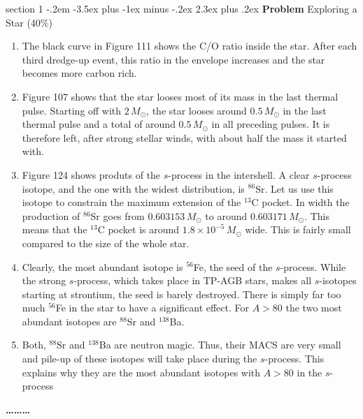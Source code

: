 \documentclass[letterpaper,12pt,twoside=false,DIV=11]{scrartcl}
\makeatletter
\newenvironment{problem}{\@startsection
    {section}
    {1}
    {-.2em}
    {-3.5ex plus -1ex minus -.2ex}
    {2.3ex plus .2ex}
    {
        \pagebreak[3] %
        \noindent\sffamily\bfseries Problem
    }
}
{
    \begin{center}\large\bfseries\ldots\ldots\ldots\end{center}
}
\providecommand{\ex}[1]{\ensuremath{^{#1}}}
\makeatother
\begin{document}
\begin{problem}{Exploring a Star (40\%)}

\begin{enumerate}
    \item The black curve in Figure 111 shows the C/O ratio inside the star. After each third dredge-up event, this ratio in the envelope increases and the star becomes more carbon rich.
    \item Figure 107 shows that the star looses most of its mass in the last thermal pulse. Starting off with $2\,M_\odot$, the star looses around $0.5\,M_\odot$ in the last thermal pulse and a total of around $0.5\,M_\odot$ in all preceding pulses. It is therefore left, after strong stellar winds, with about half the mass it started with.
    \item Figure 124 shows produts of the $s$-process in the intershell. A clear $s$-process isotope, and the one with the widest distribution, is \ex{86}Sr. Let us use this isotope to constrain the maximum extension of the \ex{13}C pocket. In width the production of \ex{86}Sr goes from $0.603153\,M_\odot$ to around $0.603171\,M_\odot$. This means that the \ex{13}C pocket is around $1.8\times10^{-5}\,M_\odot$ wide. This is fairly small compared to the size of the whole star.
    \item Clearly, the most abundant isotope is \ex{56}Fe, the seed of the $s$-process. While the strong $s$-process, which takes place in TP-AGB stars, makes all $s$-isotopes starting at strontium, the seed is barely destroyed. There is simply far too much \ex{56}Fe in the star to have a significant effect. For $A>80$ the two most abundant isotopes are \ex{88}Sr and \ex{138}Ba.
    \item Both, \ex{88}Sr and \ex{138}Ba are neutron magic. Thus, their MACS are very small and pile-up of these isotopes will take place during the $s$-process. This explains why they are the most abundant isotopes with $A>80$ in the $s$-process
\end{enumerate}

\end{problem}
\end{document}
